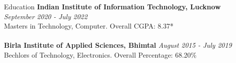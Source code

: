 \begin{rSection}{Education}
    {\bf Indian Institute of Information Technology, Lucknow} \hfill {\em September 2020 - July 2022}
    \\ Masters in Technology, Computer.\hfill { Overall CGPA: 8.37* }
    \\ \\
    {\bf Birla Institute of Applied Sciences, Bhimtal} \hfill {\em August 2015 - July 2019}
    \\ Bechlors of Technology, Electronics. \hfill { Overall Percentage: 68.20\%}
\end{rSection}